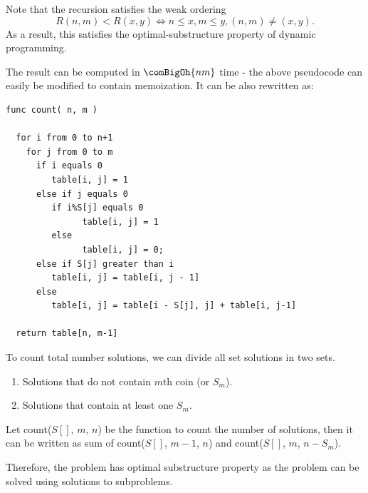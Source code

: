 
Note that the recursion satisfies the weak ordering
\begin{equation*}
R(n,m)<R(x,y)\iff n\leq x,m\leq y, (n,m)\neq (x,y).
\end{equation*}
As a result, this satisfies the optimal-substructure property of dynamic
programming.

The result can be computed in $\comBigOh{nm}$ time - the above pseudocode
can easily be modified to contain memoization. It can be also rewritten as:
\begin{lstlisting}[style=pseudostyle]
func count( n, m )

  for i from 0 to n+1
    for j from 0 to m
      if i equals 0
         table[i, j] = 1          
      else if j equals 0
         if i%S[j] equals 0
               table[i, j] = 1  
         else 
               table[i, j] = 0;
      else if S[j] greater than i
         table[i, j] = table[i, j - 1]
      else 
         table[i, j] = table[i - S[j], j] + table[i, j-1]

  return table[n, m-1]
\end{lstlisting}

\rrsepline{}

\textbf{}


To count total number solutions, we can divide all set solutions in two
sets.
\begin{enumerate}[label=\textbf{\arabic*.}]
\item Solutions that do not contain $m$th coin (or $S_m$).
\item Solutions that contain at least one $S_m$.
\end{enumerate}
Let count($S[]$, $m$, $n$) be the function to count the number of solutions,
then it can be written as sum of count($S[]$, $m-1$, $n$) and count($S[]$,
$m$, $n-S_m$).

Therefore, the problem has optimal substructure property as the problem can
be solved using solutions to subproblems.


